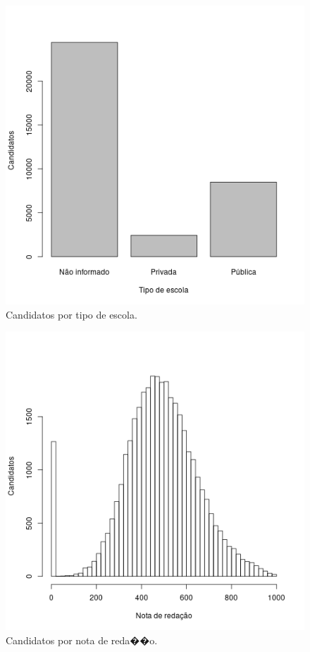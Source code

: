 \documentclass[12pt]{article}
\begin{document}
\begin{minipage}{.5\textwidth}
    \begin{figure}[H]
    \includegraphics[width=\linewidth]{../geral_candidatos-por-escola.png}
    \caption{Candidatos por tipo de escola.}
    \label{fig:candidatos-por-escola}
    \end{figure}
\end{minipage}%
\begin{minipage}{.5\textwidth}
\begin{figure}[H]
\centering\includegraphics[width=\linewidth]{../geral_candidatos-por-nota.png}
\caption{Candidatos por nota de reda��o.}
\label{fig:candidatos-por-nota}
\end{figure}
\end{minipage}
\end{document}

